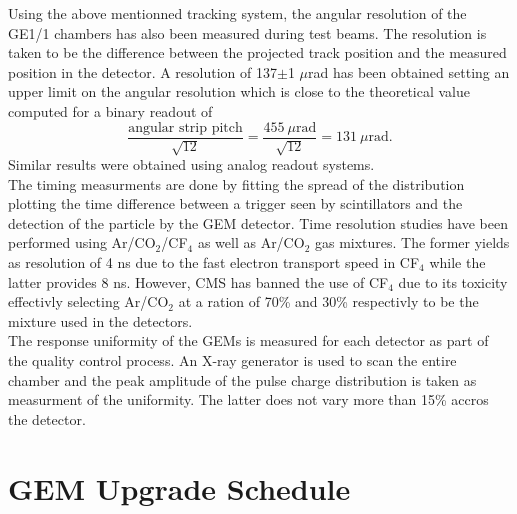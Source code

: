     Using the above mentionned tracking system, the angular resolution of the GE1/1 chambers has also been measured during test beams. The resolution is taken to be the difference between the projected track position and the measured position in the detector. A resolution of 137$\pm$1 $\mu$rad has been obtained setting an upper limit on the angular resolution which is close to the theoretical value computed for a binary readout of
    \begin{equation}
      \frac{\text{angular strip pitch}}{\sqrt{12}} = \frac{455\  \mu\text{rad}}{\sqrt{12}} = 131\ \mu\text{rad} .
    \end{equation}
    Similar results were obtained using analog readout systems. \\

    The timing measurments are done by fitting the spread of the distribution plotting the time difference between a trigger seen by scintillators and the detection of the particle by the GEM detector. Time resolution studies have been performed using Ar/CO$_2$/CF$_4$ as well as Ar/CO$_2$ gas mixtures. The former yields as resolution of 4 ns due to the fast electron transport speed in CF$_4$ while the latter provides 8 ns. However, CMS has banned the use of CF$_4$ due to its toxicity effectivly selecting Ar/CO$_2$ at a ration of 70\% and 30\% respectivly to be the mixture used in the detectors. \\

    The response uniformity of the GEMs is measured for each detector as part of the quality control process. An X-ray generator is used to scan the entire chamber and the peak amplitude of the pulse charge distribution is taken as measurment of the uniformity. The latter does not vary more than 15\% accros the detector.
































  \section{GEM Upgrade Schedule}
